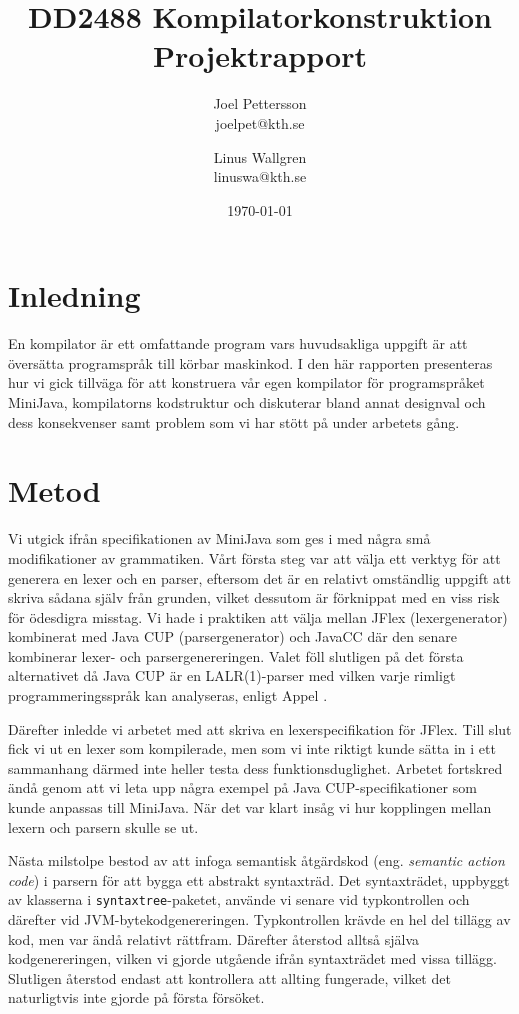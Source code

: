 \documentclass[a4paper,11pt]{article}
\title{
    {\sc DD2488 Kompilatorkonstruktion} \\ 
    Projektrapport
}
\author{
Joel Pettersson \\
joelpet@kth.se \\
\and
Linus Wallgren \\
linuswa@kth.se \\
}
\date{\today}
\newcommand{\trans}[2][eng.]{(#1 \emph{#2})}
\renewcommand{\*}[0]{\cdot}
\begin{document}
\maketitle
\newpage

\section*{Inledning}

En kompilator är ett omfattande program vars huvudsakliga uppgift är att
översätta programspråk till körbar maskinkod. I den här rapporten presenteras
hur vi gick tillväga för att konstruera vår egen kompilator för programspråket
MiniJava, kompilatorns kodstruktur och diskuterar bland annat designval och
dess konsekvenser samt problem som vi har stött på under arbetets gång.

\section*{Metod}

Vi utgick ifrån specifikationen av MiniJava som ges i \cite{appel2002} med
några små modifikationer av grammatiken. Vårt första steg var att välja ett
verktyg för att generera en lexer och en parser, eftersom det är en relativt
omständlig uppgift att skriva sådana själv från grunden, vilket dessutom är
förknippat med en viss risk för ödesdigra misstag. Vi hade i praktiken att
välja mellan JFlex (lexergenerator) kombinerat med Java CUP (parsergenerator)
och JavaCC där den senare kombinerar lexer- och parsergenereringen. Valet föll
slutligen på det första alternativet då Java CUP är en LALR(1)-parser med
vilken varje rimligt programmeringsspråk kan analyseras, enligt Appel
\cite{appel2002}.

Därefter inledde vi arbetet med att skriva en lexerspecifikation för JFlex.
Till slut fick vi ut en lexer som kompilerade, men som vi inte riktigt kunde
sätta in i ett sammanhang därmed inte heller testa dess funktionsduglighet.
Arbetet fortskred ändå genom att vi leta upp några exempel på Java
CUP-specifikationer som kunde anpassas till MiniJava. När det var klart insåg
vi hur kopplingen mellan lexern och parsern skulle se ut.

Nästa milstolpe bestod av att infoga semantisk åtgärdskod \trans{semantic
action code} i parsern för att bygga ett abstrakt syntaxträd. Det syntaxträdet,
uppbyggt av klasserna i \texttt{syntaxtree}-paketet, använde vi senare vid
typkontrollen och därefter vid JVM-bytekodgenereringen. Typkontrollen krävde en
hel del tillägg av kod, men var ändå relativt rättfram. Därefter återstod
alltså själva kodgenereringen, vilken vi gjorde utgående ifrån syntaxträdet med
vissa tillägg. Slutligen återstod endast att kontrollera att allting fungerade,
vilket det naturligtvis inte gjorde på första försöket.
\end{document}
